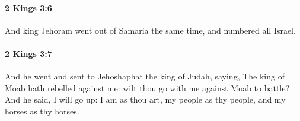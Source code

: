 		\paragraph{2 Kings 3:6} %
			\label{2KINGS-3-6}

			And king Jehoram went out of Samaria the same time, and numbered all Israel.


		\paragraph{2 Kings 3:7} %
			\label{2KINGS-3-7}

			And he went and sent to Jehoshaphat the king of Judah, saying, The king of Moab hath rebelled against me: wilt thou go with me against Moab to battle? And he said, I will go up: I am as thou art, my people as thy people, and my horses as thy horses.


